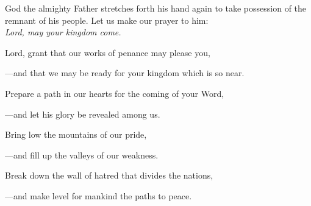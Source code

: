 \intercessions\indent

\begin{hangpar}

God the almighty Father stretches forth his hand again to take possession of the remnant of his people. Let us make our prayer to him:\\
\emph{Lord, may your kingdom come.}

\medskip Lord, grant that our works of penance may please you,

{\color{red}---\thinspace}and that we may be ready for your kingdom which is so near.

\medskip Prepare a path in our hearts for the coming of your Word,

{\color{red}---\thinspace}and let his glory be revealed among us.

\medskip Bring low the mountains of our pride,

{\color{red}---\thinspace}and fill up the valleys of our weakness.

\medskip Break down the wall of hatred that divides the nations,

{\color{red}---\thinspace}and make level for mankind the paths to peace.

\end{hangpar}